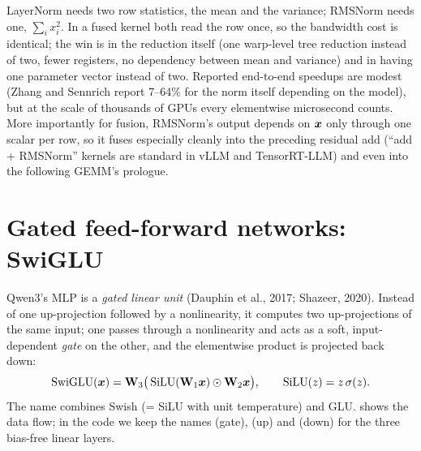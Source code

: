 \begin{systemslens}
LayerNorm needs two row statistics, the mean and the variance; RMSNorm needs one,
$\sum_i x_i^2$. In a fused kernel both read the row once, so the bandwidth cost is identical; the
win is in the reduction itself (one warp-level tree reduction instead of two, fewer registers, no
dependency between mean and variance) and in having one parameter vector instead of two. Reported
end-to-end speedups are modest (Zhang and Sennrich report 7--64\% for the norm itself depending on
the model), but at the scale of thousands of GPUs every elementwise microsecond counts. More
importantly for fusion, RMSNorm's output depends on $\bm{x}$ only through one scalar per row, so it
fuses especially cleanly into the preceding residual add (``add + RMSNorm'' kernels are standard in
vLLM and TensorRT-LLM) and even into the following GEMM's prologue.
\end{systemslens}

\section{Gated feed-forward networks: SwiGLU}\label{sec:modern:swiglu}

Qwen3's MLP is a \emph{gated linear unit} (Dauphin et al., 2017; Shazeer, 2020). Instead of one
up-projection followed by a nonlinearity, it computes two up-projections of the same input; one
passes through a nonlinearity and acts as a soft, input-dependent \emph{gate} on the other, and the
elementwise product is projected back down:
\begin{equation}
\mathrm{SwiGLU}(\bm{x}) = \mathbf{W}_3\big(\operatorname{SiLU}(\mathbf{W}_1\bm{x})\odot \mathbf{W}_2\bm{x}\big),\qquad
\operatorname{SiLU}(z)=z\,\sigma(z) .
\label{eq:modern:swiglu}
\end{equation}
The name combines Swish (= SiLU with unit temperature) and GLU.  shows the
data flow; in the code we keep the names  (gate),  (up) and  (down)
for the three bias-free linear layers.

